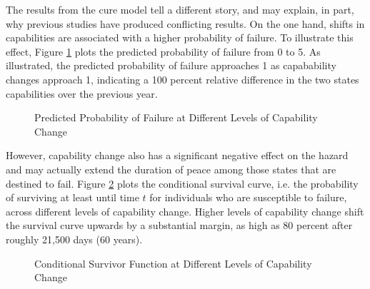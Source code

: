 The results from the cure model tell a different story, and may explain, in part, why previous studies have produced conflicting results. On the one hand, shifts in capabilities are associated with a higher probability of failure. To illustrate this effect, Figure \ref{fig:lhr.cap.pp} plots the predicted probability of failure from 0 to 5.%
As illustrated, the predicted probability of failure approaches 1 as capabability changes approach 1, indicating a 100 percent relative difference in the two states capabilities over the previous year.

\begin{figure}[htbp]\centering
	\caption{Predicted Probability of Failure at Different Levels of Capability Change}
	\label{fig:lhr.cap.pp}
\end{figure}

However, capability change also has a significant negative effect on the hazard and may actually extend the duration of peace among those states that are destined to fail. Figure \ref{fig:lhr.cap.surv} plots the conditional survival curve, i.e. the probability of surviving at least until time $t$ for individuals who are susceptible to failure, across different levels of capability change. Higher levels of capability change shift the survival curve upwards by a substantial margin, as high as 80 percent after roughly 21,500 days (60 years). 

\begin{figure}[htbp]\centering
	\caption{Conditional Survivor Function at Different Levels of Capability Change}
	\label{fig:lhr.cap.surv}
\end{figure}

